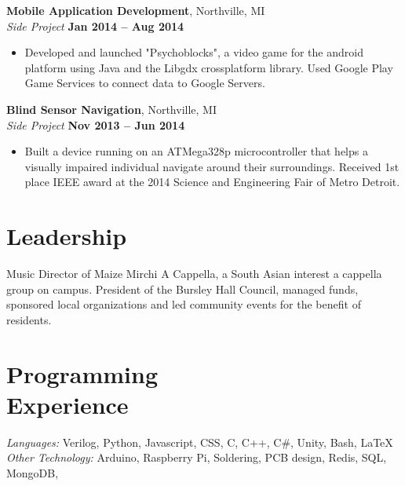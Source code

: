 \documentclass[margin,line]{resume}
\begin{document}
\begin{resume}
    \textbf{Mobile Application Development}, Northville, MI \vspace{2mm}\\\vspace{1mm}%
    \textsl{Side Project} \hfill \textbf{Jan 2014 -- Aug 2014}
    \begin{itemize}
    	\item 	Developed and launched "Psychoblocks", a video game for the android platform using Java and the Libgdx cross­platform library. Used Google Play Game Services to connect data to Google Servers.
    \end{itemize}
	
    \textbf{Blind Sensor Navigation}, Northville, MI \vspace{2mm}\\\vspace{1mm}%
	\textsl{Side Project} \hfill \textbf{Nov 2013 -- Jun 2014}
	\begin{itemize}
		\item Built a device running on an ATMega328p micro­controller that helps a visually impaired individual navigate around their surroundings. Received 1st place IEEE award at the 2014 Science and Engineering Fair of Metro Detroit. 
	\end{itemize}
	


   \section{\mysidestyle Leadership}
    Music Director of Maize Mirchi A Cappella, a South Asian interest a cappella group on campus. President of the Bursley Hall Council, managed funds, sponsored local organizations and led community events for the benefit of residents. 
\vspace{-2mm}

    \section{\mysidestyle Programming\\Experience}

    \emph{Languages:} Verilog, Python, Javascript, CSS, C,  C++, C\#, Unity, Bash, \LaTeX \\
    \emph{Other Technology:}  Arduino, Raspberry Pi, Soldering, PCB design, Redis, SQL, MongoDB,
\end{resume}
\end{document}
